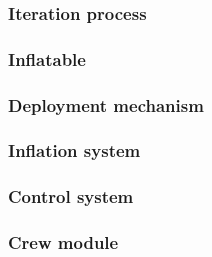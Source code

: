 \subsubsection{Iteration process}\label{subsec:itproc}


\subsubsection{Inflatable}\label{subsec:infldes}


%

\subsubsection{Deployment mechanism}\label{subsec:depldes}


\subsubsection{Inflation system}\label{subsec:inflsys}


\subsubsection{Control system}\label{subsec:controlsys}


\subsubsection{Crew module}\label{subsec:crewmod}


